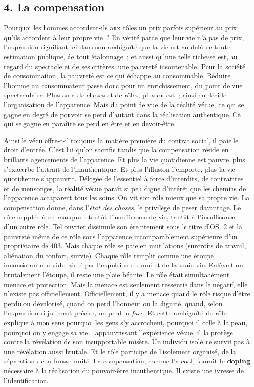 \documentclass[french,twoside]{book} %
\begin{document}
\subsection[{4. La compensation}]{\textsc{4.} La compensation}
\noindent Pourquoi les hommes accordent-ils aux rôles un prix parfois supérieur au prix qu’ils accordent à leur propre vie ? En vérité parce que leur vie n’a pas de prix, l’expression signifiant ici dans son ambiguïté que la vie est au-delà de toute estimation publique, de tout étalonnage ; et aussi qu’une telle richesse est, au regard du spectacle et de ses critères, une pauvreté insoutenable. Pour la société de consommation, la pauvreté est ce qui échappe au consommable. Réduire l’homme au consommateur passe donc pour un enrichissement, du point de vue spectaculaire. Plus on a de choses et de rôles, plus on est ; ainsi en décide l’organisation de l’apparence. Mais du point de vue de la réalité vécue, ce qui se gagne en degré de pouvoir se perd d’autant dans la réalisation authentique. Ce qui se gagne en paraître se perd en être et en devoir-être.\par
Ainsi le vécu offre-t-il toujours la matière première du contrat social, il paie le droit d’entrée. C’est lui qu’on sacrifie tandis que la compensation réside en brillants agencements de l’apparence. Et plus la vie quotidienne est pauvre, plus s’exacerbe l’attrait de l’inauthentique. Et plus l’illusion l’emporte, plus la vie quotidienne s’appauvrit. Délogée de l’essentiel à force d’interdits, de contraintes et de mensonges, la réalité vécue paraît si peu digne d’intérêt que les chemins de l’apparence accaparent tous les soins. On vit son rôle mieux que sa propre vie. La compensation donne, dans l’\emph{état des choses}, le privilège de peser davantage. Le rôle supplée à un manque : tantôt l’insuffisance de vie, tantôt à l’insuffisance d’un autre rôle. Tel ouvrier dissimule son éreintement sous le titre d’OS. 2 et la pauvreté même de ce rôle sous l’apparence incomparablement supérieure d’un propriétaire de 403. Mais chaque rôle se paie en mutilations (surcroîts de travail, aliénation du confort, survie). Chaque rôle remplit comme une étoupe inconsistante le vide laissé par l’expulsion du moi et de la vraie vie. Enlève-t-on brutalement l’étoupe, il reste une plaie béante. Le rôle était simultanément menace et protection. Mais la menace est seulement ressentie dans le négatif, elle n’existe pas officiellement. Officiellement, il y a menace quand le rôle risque d’être perdu ou dévalorisé, quand on perd l’honneur ou la dignité, quand, selon l’expression si joliment précise, on perd la \emph{face}. Et cette ambiguïté du rôle explique à mon sens pourquoi les gens s’y accrochent, pourquoi il colle à la peau, pourquoi on y engage sa vie : appauvrissant l’expérience vécue, il la protège contre la révélation de son insupportable misère. Un individu isolé ne survit pas à une révélation aussi brutale. Et le rôle participe de l’isolement organisé, de la séparation de la fausse unité. La compensation, comme l’alcool, fournit le \textbf{doping} nécessaire à la réalisation du pouvoir-être inauthentique. Il existe une ivresse de l’identification.\par
\end{document}
